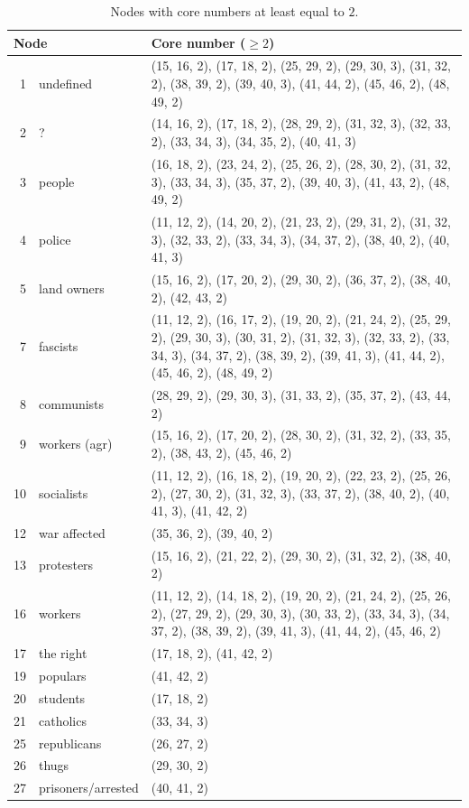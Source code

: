 \documentclass[a4paper,twoside,10pt]{article}
\begin{document}
\begin{center}
\begin{longtable}{rlp{8.3cm}}
\caption{Nodes with core numbers at least equal to $2.$}
\label{violencecore2}\\
 \multicolumn{2}{l}{\textbf{Node}} & \textbf{Core number} ($\geq 2$)\\
 \endhead
  1 & undefined    &(15, 16, 2), (17, 18, 2), (25, 29, 2), (29, 30, 3), (31, 32, 2), (38, 39, 2), (39, 40, 3),
                    (41, 44, 2), (45, 46, 2), (48, 49, 2)\\
  2 & ?            &(14, 16, 2), (17, 18, 2), (28, 29, 2), (31, 32, 3), (32, 33, 2), (33, 34, 3), (34, 35, 2),
                    (40, 41, 3)\\
  3 & people       &(16, 18, 2), (23, 24, 2), (25, 26, 2), (28, 30, 2), (31, 32, 3), (33, 34, 3), (35, 37, 2),
                    (39, 40, 3), (41, 43, 2), (48, 49, 2)\\
  4 & police       &(11, 12, 2), (14, 20, 2), (21, 23, 2), (29, 31, 2), (31, 32, 3), (32, 33, 2), (33, 34, 3), (34, 37, 2), (38, 40, 2), (40, 41, 3)\\
  5 & land owners  &(15, 16, 2), (17, 20, 2), (29, 30, 2), (36, 37, 2), (38, 40, 2), (42, 43, 2)\\
  7 & fascists     &(11, 12, 2), (16, 17, 2), (19, 20, 2), (21, 24, 2), (25, 29, 2), (29, 30, 3), (30, 31, 2), (31, 32, 3), (32, 33, 2), (33, 34, 3), (34, 37, 2), (38, 39, 2), (39, 41, 3), (41, 44, 2), (45, 46, 2), (48, 49, 2)\\
  8 & communists   &(28, 29, 2), (29, 30, 3), (31, 33, 2), (35, 37, 2), (43, 44, 2)\\
  9 & workers (agr)&(15, 16, 2), (17, 20, 2), (28, 30, 2), (31, 32, 2), (33, 35, 2), (38, 43, 2), (45, 46, 2)\\
 10 & socialists   &(11, 12, 2), (16, 18, 2), (19, 20, 2), (22, 23, 2), (25, 26, 2), (27, 30, 2), (31, 32, 3), (33, 37, 2), (38, 40, 2), (40, 41, 3), (41, 42, 2)\\
 12 & war affected  &(35, 36, 2), (39, 40, 2)\\
 13 & protesters   &(15, 16, 2), (21, 22, 2), (29, 30, 2), (31, 32, 2), (38, 40, 2)\\
 16 & workers      &(11, 12, 2), (14, 18, 2), (19, 20, 2), (21, 24, 2), (25, 26, 2), (27, 29, 2), (29, 30, 3), (30, 33, 2), (33, 34, 3), (34, 37, 2), (38, 39, 2), (39, 41, 3), (41, 44, 2), (45, 46, 2)\\
 17 & the right    &(17, 18, 2), (41, 42, 2)\\
 19 & populars     &(41, 42, 2)\\
 20 & students     &(17, 18, 2)\\
 21 & catholics    &(33, 34, 3)\\
 25 & republicans  &(26, 27, 2)\\
 26 & thugs        &(29, 30, 2)\\
 27 & prisoners/arrested  &(40, 41, 2)
\end{longtable}
\end{center}
\end{document}
